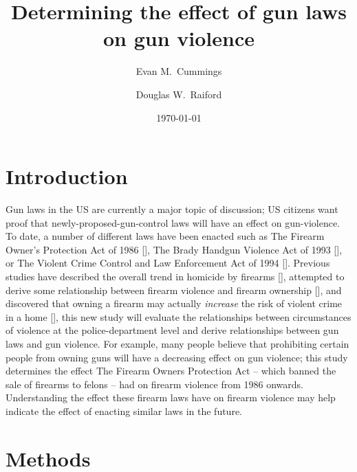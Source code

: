 \documentclass{evanarticle}
\title{Determining the effect of gun laws on gun violence}
\author{Evan M.~Cummings \and Douglas W.~Raiford}
\date{\today}
\begin{document}

\section{Introduction}

Gun laws in the US are currently a major topic of discussion; US citizens want proof that newly-proposed-gun-control laws will have an effect on gun-violence.  To date, a number of different laws have been enacted such as The Firearm Owner's Protection Act of 1986 [\cite{fopa}], The Brady Handgun Violence Act of 1993 [\cite{fflra}], or The Violent Crime Control and Law Enforcement Act of 1994 [\cite{vcclea}].  Previous studies have described the overall trend in homicide by firearms [\cite{cooper}], attempted to derive some relationship between firearm violence and firearm ownership [\cite{swedler}], and discovered that owning a firearm may actually \emph{increase} the risk of violent crime in a home [\cite{kellermann}], this new study will evaluate the relationships between circumstances of violence at the police-department level and derive relationships between gun laws and gun violence.  For example, many people believe that prohibiting certain people from owning guns will have a decreasing effect on gun violence; this study determines the effect The Firearm Owners Protection Act -- which banned the sale of firearms to felons -- had on firearm violence from 1986 onwards.  Understanding the effect these firearm laws have on firearm violence may help indicate the effect of enacting similar laws in the future.

\section{Methods}
\end{document}
